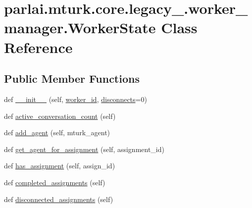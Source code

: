 \hypertarget{classparlai_1_1mturk_1_1core_1_1legacy__2018_1_1worker__manager_1_1WorkerState}{}\section{parlai.\+mturk.\+core.\+legacy\+\_.\+worker\+\_\+manager.\+Worker\+State Class Reference}
\label{classparlai_1_1mturk_1_1core_1_1legacy__2018_1_1worker__manager_1_1WorkerState}
\subsection*{Public Member Functions}
\begin{DoxyCompactItemize}
\item 
def \hyperlink{classparlai_1_1mturk_1_1core_1_1legacy__2018_1_1worker__manager_1_1WorkerState_a1f84cd0e83112d5758bdb17b0793f309}{\+\_\+\+\_\+init\+\_\+\+\_\+} (self, \hyperlink{classparlai_1_1mturk_1_1core_1_1legacy__2018_1_1worker__manager_1_1WorkerState_ac69bbf7c4bfd34eb297ae091523f46b5}{worker\+\_\+id}, \hyperlink{classparlai_1_1mturk_1_1core_1_1legacy__2018_1_1worker__manager_1_1WorkerState_ac510ecfdd12ff572cb5ad16629dbd36e}{disconnects}=0)
\item 
def \hyperlink{classparlai_1_1mturk_1_1core_1_1legacy__2018_1_1worker__manager_1_1WorkerState_a0f22df8925f5461e6a55ddd6b2cc22b3}{active\+\_\+conversation\+\_\+count} (self)
\item 
def \hyperlink{classparlai_1_1mturk_1_1core_1_1legacy__2018_1_1worker__manager_1_1WorkerState_a22b3660299c3dd56fb396bf9d6672d2a}{add\+\_\+agent} (self, mturk\+\_\+agent)
\item 
def \hyperlink{classparlai_1_1mturk_1_1core_1_1legacy__2018_1_1worker__manager_1_1WorkerState_af5d8f601efd7223f5b2d91b2df3582e2}{get\+\_\+agent\+\_\+for\+\_\+assignment} (self, assignment\+\_\+id)
\item 
def \hyperlink{classparlai_1_1mturk_1_1core_1_1legacy__2018_1_1worker__manager_1_1WorkerState_a71a385a16ef2f33d32cde9050350580c}{has\+\_\+assignment} (self, assign\+\_\+id)
\item 
def \hyperlink{classparlai_1_1mturk_1_1core_1_1legacy__2018_1_1worker__manager_1_1WorkerState_a8ddde60a6054ad699818c749e310cb91}{completed\+\_\+assignments} (self)
\item 
def \hyperlink{classparlai_1_1mturk_1_1core_1_1legacy__2018_1_1worker__manager_1_1WorkerState_a71b6e7fc9890824b62fc968e3c7559ce}{disconnected\+\_\+assignments} (self)
\end{DoxyCompactItemize}

